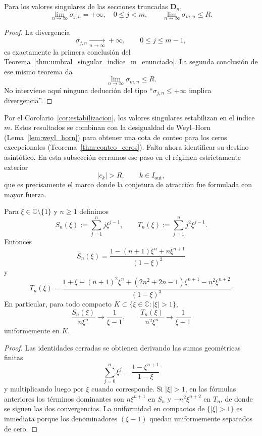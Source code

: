 \begin{cor}\label{cor:estabilizacion}
	Para los valores singulares de las secciones truncadas $\mathbf{D}_n$,
	\[
		\lim_{n\to\infty}\sigma_{j,n}=+\infty,\quad 0\le j<m,
		\qquad
		\lim_{n\to\infty}\sigma_{m,n}\le R.
	\]
\end{cor}

\begin{proof}
	La divergencia
	\[
		\sigma_{j,n}\xrightarrow[n\to\infty]{}+\infty,
		\qquad 0\le j\le m-1,
	\]
	es exactamente la primera conclusión del Teorema~\ref{thm:umbral_singular_indice_m_enunciado}. La segunda conclusión de ese mismo teorema da
	\[
		\lim_{n\to\infty}\sigma_{m,n}\le R.
	\]
	No interviene aquí ninguna deducción del tipo ``$\sigma_{j,n}\le +\infty$ implica divergencia''.
\end{proof}

Por el Corolario~\ref{cor:estabilizacion}, los valores singulares estabilizan en el índice $m$. Estos resultados se combinan con la desigualdad de Weyl--Horn (Lema~\ref{lem:weyl_horn}) para obtener una cota de conteo para los ceros excepcionales (Teorema~\ref{thm:conteo_ceros}). Falta ahora identificar su destino asintótico. En esta subsección cerramos ese paso en el régimen estrictamente exterior
\[
	|c_k|>R,\qquad k\in I_{\mathrm{out}},
\]
que es precisamente el marco donde la conjetura de atracción fue formulada con mayor fuerza.

\begin{lem}\label{lem:sumas_geometricas_ponderadas}
	Para $\xi\in\mathbb C\setminus\{1\}$ y $n\ge1$ definimos
	\[
		S_n(\xi):=\sum_{j=1}^n j\xi^{j-1},
		\qquad
		T_n(\xi):=\sum_{j=1}^n j^2\xi^{j-1}.
	\]
	Entonces
	\[
		S_n(\xi)=\frac{1-(n+1)\xi^n+n\xi^{n+1}}{(1-\xi)^2}
	\]
	y
	\[
		T_n(\xi)=\frac{1+\xi-(n+1)^2\xi^n+(2n^2+2n-1)\xi^{n+1}-n^2\xi^{n+2}}{(1-\xi)^3}.
	\]
	En particular, para todo compacto $K\subset\{\xi\in\mathbb C:|\xi|>1\}$,
	\[
		\frac{S_n(\xi)}{n\xi^n}\longrightarrow \frac{1}{\xi-1},
		\qquad
		\frac{T_n(\xi)}{n^2\xi^n}\longrightarrow \frac{1}{\xi-1}
	\]
	uniformemente en $K$.
\end{lem}

\begin{proof}
	Las identidades cerradas se obtienen derivando las sumas geométricas finitas
	\[
		\sum_{j=0}^n \xi^j=\frac{1-\xi^{n+1}}{1-\xi}
	\]
	y multiplicando luego por $\xi$ cuando corresponde. Si $|\xi|>1$, en las fórmulas anteriores los términos dominantes son $n\xi^{n+1}$ en $S_n$ y $-n^2\xi^{n+2}$ en $T_n$, de donde se siguen las dos convergencias. La uniformidad en compactos de $\{|\xi|>1\}$ es inmediata porque los denominadores $(\xi-1)$ quedan uniformemente separados de cero.
\end{proof}

